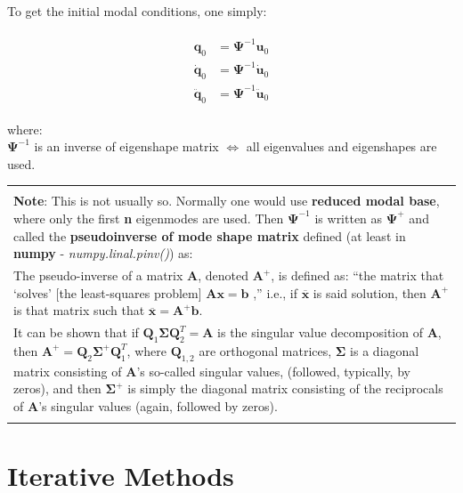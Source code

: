 \documentclass[10pt,b5paper,titlepage]{book}
\newenvironment{bbox}[1][0.96]
{
    \begin{center}
        \begin{tabular}{|p{#1\textwidth}|}
            \hline\\
}
{
            \\\\\hline
        \end{tabular}
    \end{center}
}
\newenvironment{eqarray}
{
    \begin{eqnarray}
        \begin{aligned}
}
{
        \end{aligned}
    \end{eqnarray}
}
\begin{document}
To get the initial modal conditions, one simply:

\begin{eqarray}
    \mathbf{q}_0 &= \mathbf{\Psi}^{-1} \mathbf{u}_0 \\
    \mathbf{\dot{q}}_0 &= \mathbf{\Psi}^{-1} \mathbf{\dot{u}}_0 \\
    \mathbf{\ddot{q}}_0 &= \mathbf{\Psi}^{-1} \mathbf{\ddot{u}}_0
\end{eqarray}

where:\\
$ \mathbf{\Psi}^{-1} $ is an inverse of eigenshape matrix $ \Leftrightarrow $ all eigenvalues
and eigenshapes are used.

\begin{bbox}[0.96]
    \textbf{Note}: This is not usually so. Normally one would use
    \textbf{reduced modal base}, where only the first \textbf{n} eigenmodes are used. Then
    $ \mathbf{\Psi}^{-1} $ is written as $ \mathbf{\Psi}^{+} $ and called the
    \textbf{pseudoinverse of mode shape matrix} defined (at least in \textbf{numpy}
    - \textit{numpy.linal.pinv()}) as:\\

    \smallskip
    The pseudo-inverse of a matrix $ \mathbf{A} $, denoted $ \mathbf{A}^{+} $,
    is defined as: “the matrix that ‘solves’ [the least-squares problem]
    $ \mathbf{A} \mathbf{x} = \mathbf{b} $ ,” i.e., if $ \overline{\mathbf{x}} $
    is said solution, then $ \mathbf{A}^{+} $ is that matrix such that
    $ \overline{\mathbf{x}} = \mathbf{A}^{+} \mathbf{b} $.\\

    \smallskip
    It can be shown that if $ \mathbf{Q}_1 \mathbf{\Sigma} \mathbf{Q}_2^T = \mathbf{A} $
    is the singular value decomposition of $ \mathbf{A} $, then
    $ \mathbf{A}^{+} = \mathbf{Q}_2 \mathbf{\Sigma}^{+} \mathbf{Q}_1^T $, where $ \mathbf{Q}_{1,2} $
    are orthogonal matrices, $ \mathbf{\Sigma} $  is a diagonal matrix consisting of
    $ \mathbf{A} $’s so-called singular values, (followed, typically, by zeros),
    and then $ \mathbf{\Sigma}^{+} $ is simply the diagonal matrix consisting
    of the reciprocals of $ \mathbf{A} $’s singular values (again, followed
    by zeros).
\end{bbox}




\chapter{Iterative Methods}
\end{document}
